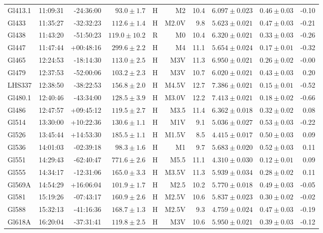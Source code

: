 \documentclass[structabstract]{aa}
\begin{document}
\begin{center}
\begin{longtable}{ l r r r r r r r r r}
Gl413.1 & 11:09:31 & -24:36:00 & $93.0\pm 1.7$ & H & M2 & 10.4 & $6.097\pm0.023$ & $0.46\pm0.03$ & -0.10 \\
Gl433 & 11:35:27 & -32:32:23 & $112.6\pm 1.4$ & H & M2.0V &  9.8 & $5.623\pm0.021$ & $0.47\pm0.03$ & -0.21 \\
Gl438 & 11:43:20 & -51:50:23 & $119.0\pm10.2$ & R & M0 & 10.4 & $6.320\pm0.021$ & $0.33\pm0.03$ & -0.26 \\
Gl447 & 11:47:44 & +00:48:16 & $299.6\pm 2.2$ & H & M4 & 11.1 & $5.654\pm0.024$ & $0.17\pm0.01$ & -0.32 \\
Gl465 & 12:24:53 & -18:14:30 & $113.0\pm 2.5$ & H & M3V & 11.3 & $6.950\pm0.021$ & $0.26\pm0.02$ & -0.00 \\
Gl479 & 12:37:53 & -52:00:06 & $103.2\pm 2.3$ & H & M3V & 10.7 & $6.020\pm0.021$ & $0.43\pm0.03$ & 0.20 \\
LHS337 & 12:38:50 & -38:22:53 & $156.8\pm 2.0$ & H & M4.5V & 12.7 & $7.386\pm0.021$ & $0.15\pm0.01$ & -0.52 \\
Gl480.1 & 12:40:46 & -43:34:00 & $128.5\pm 3.9$ & H & M3.0V & 12.2 & $7.413\pm0.021$ & $0.18\pm0.02$ & -0.66 \\
Gl486 & 12:47:57 & +09:45:12 & $119.5\pm 2.7$ & H & M3.5 & 11.4 & $6.362\pm0.018$ & $0.32\pm0.02$ & 0.08 \\
Gl514 & 13:30:00 & +10:22:36 & $130.6\pm 1.1$ & H & M1V &  9.1 & $5.036\pm0.027$ & $0.53\pm0.03$ & -0.22 \\
Gl526 & 13:45:44 & +14:53:30 & $185.5\pm 1.1$ & H & M1.5V &  8.5 & $4.415\pm0.017$ & $0.50\pm0.03$ & 0.09 \\
Gl536 & 14:01:03 & -02:39:18 & $98.3\pm 1.6$ & H & M1 &  9.7 & $5.683\pm0.020$ & $0.52\pm0.03$ & 0.11 \\
Gl551 & 14:29:43 & -62:40:47 & $771.6\pm 2.6$ & H & M5.5 & 11.1 & $4.310\pm0.030$ & $0.12\pm0.01$ & 0.09 \\
Gl555 & 14:34:17 & -12:31:06 & $165.0\pm 3.3$ & H & M3.5V & 11.3 & $5.939\pm0.034$ & $0.28\pm0.02$ & 0.11 \\
Gl569A & 14:54:29 & +16:06:04 & $101.9\pm 1.7$ & H & M2.5 & 10.2 & $5.770\pm0.018$ & $0.49\pm0.03$ & -0.05 \\
Gl581 & 15:19:26 & -07:43:17 & $160.9\pm 2.6$ & H & M2.5V & 10.6 & $5.837\pm0.023$ & $0.30\pm0.02$ & -0.02 \\
Gl588 & 15:32:13 & -41:16:36 & $168.7\pm 1.3$ & H & M2.5V &  9.3 & $4.759\pm0.024$ & $0.47\pm0.03$ & -0.19 \\
Gl618A & 16:20:04 & -37:31:41 & $119.8\pm 2.5$ & H & M3V & 10.6 & $5.950\pm0.021$ & $0.39\pm0.03$ & -0.12 \\

\end{longtable}
\end{center}
\end{document}

